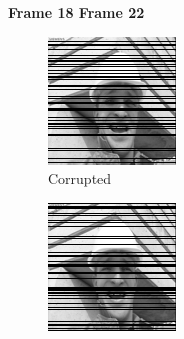 \begin{figure}
  \centering
  \textbf{\hspace{0.2in} Frame 18 \hspace{1.5in} Frame 22\hspace{0.5in}\vspace{0.1in}}
  \begin{subfigure}{0.4\textwidth}
    \centering
    \includegraphics[width=.9\textwidth]{Chapter7/Images/foreman70_masked_18.png}
    \caption{Corrupted}
  \end{subfigure}
  \begin{subfigure}{0.4\textwidth}
    \centering
    \includegraphics[width=.9\textwidth]{Chapter7/Images/foreman70_masked_22.png}

\end{subfigure}
\end{figure}
